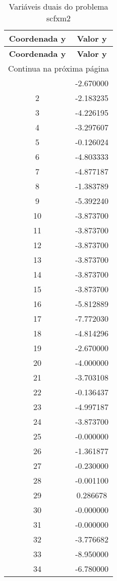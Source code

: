 \documentclass[12pt]{article}
\begin{document}
\begin{longtable}{@{}cc@{}}
\caption{Variáveis duais do problema scfxm2} \\
\toprule
\textbf{Coordenada y} & \textbf{Valor y} \\
\midrule
\endfirsthead

\toprule
\textbf{Coordenada y} & \textbf{Valor y} \\
\midrule
\endhead

\midrule \multicolumn{2}{r}{{Continua na próxima página}} \\ \midrule
\endfoot

\bottomrule
\endlastfoot
1 & -2.670000 \\
2 & -2.183235 \\
3 & -4.226195 \\
4 & -3.297607 \\
5 & -0.126024 \\
6 & -4.803333 \\
7 & -4.877187 \\
8 & -1.383789 \\
9 & -5.392240 \\
10 & -3.873700 \\
11 & -3.873700 \\
12 & -3.873700 \\
13 & -3.873700 \\
14 & -3.873700 \\
15 & -3.873700 \\
16 & -5.812889 \\
17 & -7.772030 \\
18 & -4.814296 \\
19 & -2.670000 \\
20 & -4.000000 \\
21 & -3.703108 \\
22 & -0.136437 \\
23 & -4.997187 \\
24 & -3.873700 \\
25 & -0.000000 \\
26 & -1.361877 \\
27 & -0.230000 \\
28 & -0.001100 \\
29 & 0.286678 \\
30 & -0.000000 \\
31 & -0.000000 \\
32 & -3.776682 \\
33 & -8.950000 \\
34 & -6.780000 \\

\end{longtable}
\end{document}
